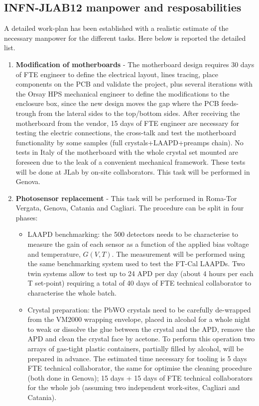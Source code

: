 \documentclass[11pt]{report}
\begin{document}
\subsection{INFN-JLAB12 manpower and resposabilities}
A detailed work-plan has been established  with a realistic estimate of the necessary manpower for the different tasks. Here below is reported the detailed list.
\begin{enumerate}
\item {\bf Modification of motherboards}  - 
The motherboard design requires 30 days of FTE engineer to define the electrical  layout, lines tracing, place components on the PCB  and validate the project,
plus several iterations with the Orsay HPS mechanical engineer to define the  modifications to the enclosure  box, since the new design moves the gap where the PCB feeds-trough from the lateral sides to the top/bottom sides.
After receiving the motherboard from the vendor, 15 days of FTE engineer are necessary for testing the electric connections,  the cross-talk and test the motherboard functionality  by some samples (full crystals+LAAPD+preamps chain).   
No  tests in Italy  of the motherboard with the whole  crystal set  mounted are foreseen due to the leak of a convenient mechanical framework. These tests will be done at JLab by on-site collaborators.
This task will be performed in Genova.
\item {\bf  Photosensor replacement} - 
This task will be performed in Roma-Tor Vergata, Genova, Catania and Cagliari. The procedure can be split in four phases:
\begin{itemize}
\item LAAPD benchmarking: the 500 detectors needs to be characterise to measure the gain of each sensor as a function of the applied bias voltage and temperature, $G(V,T)$. The measurement will be performed using 
the same benchmarking system used to test the FT-Cal LAAPDs. Two twin systems allow to test up to 24 APD per day (about 4 hours per each T set-point)  requiring a total of 40 days of  FTE technical collaborator to characterise the whole batch.  
\item Crystal preparation: the PbWO crystals need to be carefully  de-wrapped from the VM2000 wrapping envelope, placed in alcohol for a whole night  to weak or dissolve the glue between the crystal and the APD, remove the APD 
 and  clean the crystal face by acetone. To perform this operation two arrays of gas-tight plastic containers, partially filled by alcohol, will be prepared in advance. The estimated time necessary for tooling is 5 days FTE technical collaborator, the same for optimise the cleaning procedure (both done in Genova); 15 days + 15 days of FTE technical collaborators for the whole job (assuming two independent work-sites, Cagliari and Catania).

\end{itemize}
\end{enumerate}
\end{document}
